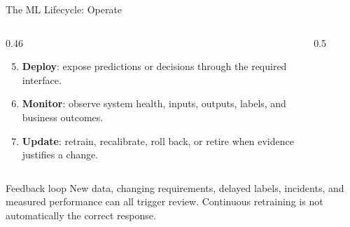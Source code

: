 \begin{frame}{The ML Lifecycle: Operate}
\begin{columns}
\begin{column}{0.46\textwidth}
\begin{enumerate}
  \setcounter{enumi}{4}
  \item \textbf{Deploy}: expose predictions or decisions through the required interface.
  \item \textbf{Monitor}: observe system health, inputs, outputs, labels, and business outcomes.
  \item \textbf{Update}: retrain, recalibrate, roll back, or retire when evidence justifies a change.
\end{enumerate}
\end{column}

\begin{column}{0.5\textwidth}
\begin{figure}
\centering
{}
\end{figure}
\end{column}
\end{columns}

\begin{block}{Feedback loop}
New data, changing requirements, delayed labels, incidents, and measured performance can all trigger review. Continuous retraining is not automatically the correct response.
\end{block}
\end{frame}


